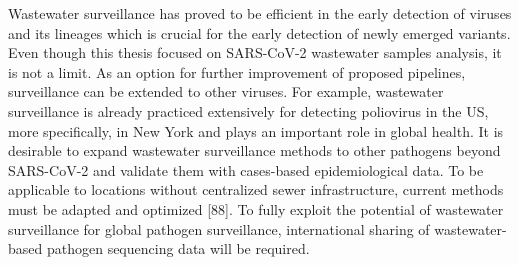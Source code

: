Wastewater surveillance has proved to be efficient in the early detection of viruses and its lineages which is crucial for the early detection of newly emerged variants. Even though this thesis focused on SARS-CoV-2 wastewater samples analysis, it is not a limit. As an option for further improvement of proposed pipelines, surveillance can be extended to other viruses. For example, wastewater surveillance is already practiced extensively for detecting poliovirus in the US, more specifically, in New York \cite{russo2022} and plays an important role in global health. It is desirable to expand wastewater surveillance methods to other pathogens beyond SARS-CoV-2 and validate them with cases-based epidemiological data. To be applicable to locations without centralized sewer infrastructure, current methods must be adapted and optimized [88]. To fully exploit the potential of wastewater surveillance for global pathogen surveillance, international sharing of wastewater-based pathogen sequencing data will be required.

\clearpage
